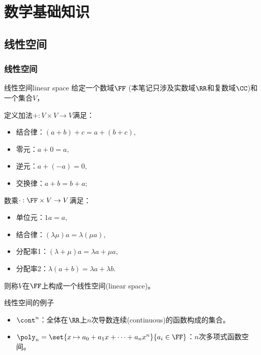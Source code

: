 \chapter{数学基础知识}
\label{chap:math basics}

\section{线性空间}
\label{sec:linear space}

\subsection{线性空间}

\begin{definition}
    {线性空间}{linear space}
    给定一个数域$\FF$ (本笔记只涉及实数域$\RR$和复数域$\CC$)和一个集合$V$，
    
    定义加法$+:V\times V\to V$满足：
    \begin{itemize}
        \item 结合律：$(a+b)+c=a+(b+c),$
        \item 零元：$a+0=a,$
        \item 逆元：$a+(-a)=0,$
        \item 交换律：$a+b=b+a;$
    \end{itemize}
    数乘$\cdot:\FF\times V\to V$满足：
    \begin{itemize}
        \item 单位元：$1a=a,$
        \item 结合律：$(\lambda\mu)a=\lambda(\mu a),$
        \item 分配率1：$(\lambda+\mu)a=\lambda a+\mu a,$
        \item 分配率2：$\lambda(a+b)=\lambda a+\lambda b.$
    \end{itemize}
    则称$V$在$\FF$上构成一个线性空间(linear space)。
\end{definition}

\begin{example}
    {线性空间的例子}{}
    \begin{itemize}
        \item $\cont^n$：全体在$\RR$上$n$次导数连续(continuous)的函数构成的集合。
        \item $\poly_n=\set{x\mapsto a_0+a_1x+\cdots+a_nx^n}{a_i\in\FF}$：$n$次多项式函数空间。
    \end{itemize}
\end{example}

